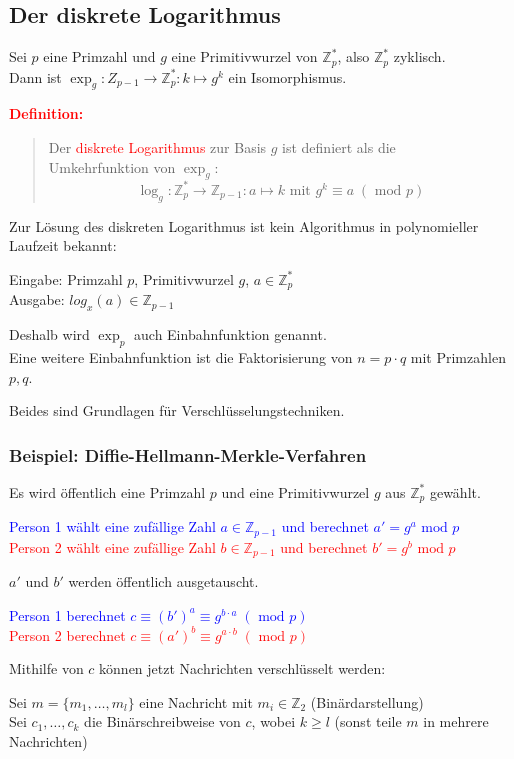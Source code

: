 \documentclass{article}
\newcommand{\red}[1]{\textcolor{red}{#1}}
\newcommand{\blue}[1]{\textcolor{blue}{#1}}
\newcommand{\de}[1]{\red{\textbf{Definition: }}\begin{quote}#1\end{quote}}
\newcommand{\Z}{\mathbb{Z}}
\renewcommand{\mod}{\text{ mod }}
\begin{document}
\subsection{Der diskrete Logarithmus}

Sei $p$ eine Primzahl und $g$ eine Primitivwurzel von $\Z_p^*$, also $\Z_p^*$ zyklisch.\\
Dann ist $\exp_g: Z_{p-1} \to \Z_p^*: k \mapsto g^k$ ein Isomorphismus.

\de{
    Der \red{diskrete Logarithmus} zur Basis $g$ ist definiert als die\\
    Umkehrfunktion von $\exp_g$:
    \[
        \log_g: \Z_p^* \to \Z_{p-1}: a \mapsto k \text{ mit } g^k \equiv a \; (\mod p)   
    \]
}

Zur Lösung des diskreten Logarithmus ist kein Algorithmus in polynomieller Laufzeit bekannt:

Eingabe: Primzahl $p$, Primitivwurzel $g$, $a \in \Z_p^*$\\
Ausgabe: $log_x(a) \in \Z_{p-1}$

Deshalb wird $\exp_p$ auch Einbahnfunktion genannt.\\
Eine weitere Einbahnfunktion ist die Faktorisierung von $n = p \cdot q$ mit Primzahlen $p,q$.

Beides sind Grundlagen für Verschlüsselungstechniken.

\subsubsection{Beispiel: Diffie-Hellmann-Merkle-Verfahren}

Es wird öffentlich eine Primzahl $p$ und eine Primitivwurzel $g$ aus $\Z_p^*$ gewählt.

\blue{Person 1 wählt eine zufällige Zahl $a \in \Z_{p-1}$ und berechnet $a' = g^a \mod p$}\\
\red{Person 2 wählt eine zufällige Zahl $b \in \Z_{p-1}$ und berechnet $b' = g^b \mod p$}

$a'$ und $b'$ werden öffentlich ausgetauscht.

\blue{Person 1 berechnet $c \equiv (b')^a \equiv g^{b \cdot a} \;(\mod p)$}\\
\red{Person 2 berechnet $c \equiv (a')^b \equiv g^{a \cdot b} \;(\mod p)$}

Mithilfe von $c$ können jetzt Nachrichten verschlüsselt werden:

Sei $m = \{m_1, \dots, m_l\}$ eine Nachricht mit $m_i \in \Z_2$ (Binärdarstellung)\\
Sei $c_1,\dots,c_k$ die Binärschreibweise von $c$, wobei $k \geq l$ (sonst teile $m$ in mehrere Nachrichten)
\end{document}

